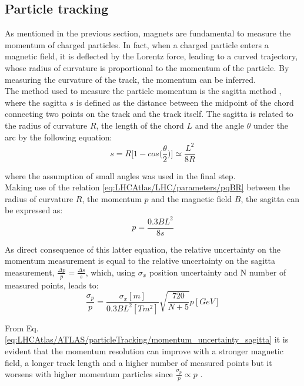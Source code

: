 \subsection{Particle tracking}\label{sec:LHCAtlas/ATLAS/particleTracking}
As mentioned in the previous section, magnets are fundamental to measure the momentum of charged particles. In fact, when a charged particle enters a magnetic field, it is deflected by the Lorentz force, leading to a curved trajectory, whose radius of curvature is proportional to the momentum of the particle. By measuring the curvature of the track, the momentum can be inferred.\\
The method used to measure the particle momentum is the sagitta method \cite{Sagitta_method}, where the sagitta $s$ is defined as the distance between the midpoint of the chord connecting two points on the track and the track itself. The sagitta is related to the radius of curvature $R$, the length of the chord $L$ and the angle $\theta$ under the arc by the following equation:
\begin{equation}\label{eq:LHCAtlas/ATLAS/particleTracking/sagitta}
    s = R\Bigg[1-cos\Bigg(\frac{\theta}{2}\Bigg)\Bigg]\simeq \frac{L^2}{8R}
\end{equation}

\noindent where the assumption of small angles was used in the final step.\\
Making use of the relation \ref{eq:LHCAtlas/LHC/parameters/pqBR} between the radius of curvature $R$, the momentum $p$ and the magnetic field $B$, the sagitta can be expressed as:
\begin{equation}\label{eq:LHCAtlas/ATLAS/particleTracking/sagitta_p}
    p = \frac{0.3BL^2}{8s}
\end{equation}

\noindent As direct consequence of this latter equation, the relative uncertainty on the momentum measurement is equal to the relative uncertainty on the sagitta measurement, $\frac{\Delta p}{p}=\frac{\Delta s}{s}$, which, using $\sigma_x$ position uncertainty and N number of measured points, leads to:
\begin{equation}\label{eq:LHCAtlas/ATLAS/particleTracking/momentum_uncertainty_sagitta}
    \frac{\sigma_p}{p} = \frac{\sigma_x [m]}{0.3BL^2 [T m^2]}\sqrt{\frac{720}{N+5}}p [GeV]
\end{equation}

\noindent From Eq. \ref{eq:LHCAtlas/ATLAS/particleTracking/momentum_uncertainty_sagitta} it is evident that the momentum resolution can improve with a stronger magnetic field, a longer track length and a higher number of measured points but it worsens with higher momentum particles since $\frac{\sigma_p}{p}\propto p$ .\\

